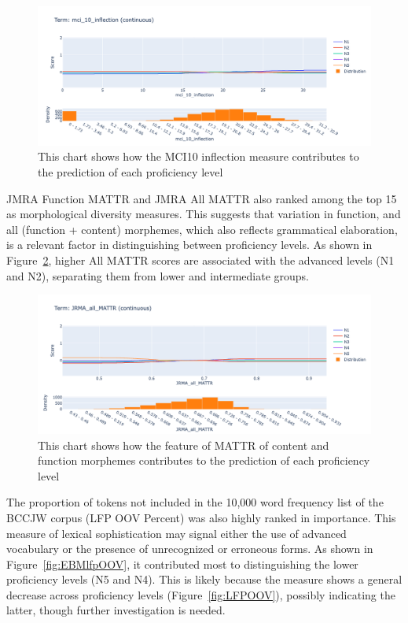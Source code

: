 \begin{figure}[h!]
    \centering
    \includegraphics[scale=.4]{img/EBM/MCI10inflection}
    \caption[Contribution of MCI 10 Inflection measure]{This chart shows how the MCI10 inflection measure contributes to the prediction of each proficiency level}
    \label{fig:EBMMCI10inflection}
\end{figure}

JMRA Function MATTR and JMRA All MATTR also ranked among the top 15 as morphological diversity measures. This
suggests that variation in function, and all (function + content) morphemes, which also reflects grammatical
elaboration, is a
relevant factor in distinguishing between proficiency levels. As shown in Figure~\ref{fig:JMRAallMATTR}, higher
All MATTR
scores are associated with the advanced levels (N1 and N2), separating them from lower and intermediate groups.

\begin{figure}[h!]
    \centering
    \includegraphics[scale=.4]{img/EBM/JMRAallMATTR}
    \caption[Contribution of JMRA function and content morphemes]{This chart shows how the feature of MATTR of content and function morphemes contributes to the prediction of each proficiency level}
    \label{fig:JMRAallMATTR}
\end{figure}

The proportion of tokens not included in the 10,000 word frequency list of the BCCJW corpus (LFP OOV Percent) was
also highly ranked in importance. This measure of lexical sophistication may signal either the use of advanced
vocabulary or the presence of unrecognized or erroneous forms. As shown in Figure~\ref{fig:EBMlfpOOV}, it
contributed most to distinguishing the lower proficiency levels (N5 and N4). This is likely because the measure
shows a general decrease across proficiency levels (Figure~\ref{fig:LFPOOV}), possibly indicating the latter,
though further investigation is needed.


